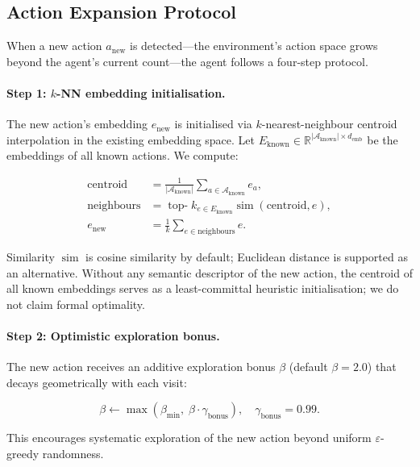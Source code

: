 \documentclass{article}
\begin{document}
\subsection{Action Expansion Protocol}

When a new action $a_\text{new}$ is detected---the environment's action space
grows beyond the agent's current count---the agent follows a four-step
protocol.

\paragraph{Step 1: $k$-NN embedding initialisation.} The new action's
embedding $e_\text{new}$ is initialised via $k$-nearest-neighbour centroid
interpolation in the existing embedding space. Let
$E_\text{known} \in \mathbb{R}^{|\mathcal{A}_\text{known}| \times d_\text{emb}}$
be the embeddings of all known actions. We compute:

\begin{align}
\text{centroid} &= \frac{1}{|\mathcal{A}_\text{known}|}
  \sum_{a \in \mathcal{A}_\text{known}} e_a, \label{eq:centroid} \\
\text{neighbours} &= \operatorname{top-}k_{e \in E_\text{known}}
  \operatorname{sim}(\text{centroid}, e), \label{eq:knn} \\
e_\text{new} &= \frac{1}{k} \sum_{e \in \text{neighbours}} e. \label{eq:new_emb}
\end{align}

Similarity $\operatorname{sim}$ is cosine similarity by default; Euclidean
distance is supported as an alternative. Without any semantic descriptor of
the new action, the centroid of all known embeddings serves as a
least-committal heuristic initialisation; we do not claim formal optimality.

\paragraph{Step 2: Optimistic exploration bonus.} The new action receives an
additive exploration bonus $\beta$ (default $\beta=2.0$) that decays
geometrically with each visit:

\begin{equation}
\beta \leftarrow \max(\beta_\text{min},\;
  \beta \cdot \gamma_\text{bonus}), \quad \gamma_\text{bonus}=0.99.
\end{equation}

This encourages systematic exploration of the new action beyond uniform
$\varepsilon$-greedy randomness.
\end{document}
